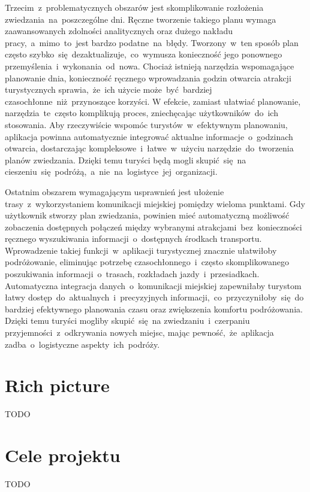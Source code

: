Trzecim~z~problematycznych obszarów jest skomplikowanie rozłożenia zwiedzania~na~poszczególne dni.
Ręczne tworzenie takiego planu wymaga zaawansowanych zdolności analitycznych oraz dużego nakładu pracy,~a~mimo~to~jest bardzo podatne~na~błędy.
Tworzony~w~ten sposób plan często szybko~się~dezaktualizuje,~co~wymusza konieczność jego ponownego przemyślenia~i~wykonania~od~nowa.
Chociaż istnieją narzędzia wspomagające planowanie dnia, konieczność ręcznego wprowadzania godzin otwarcia atrakcji turystycznych sprawia,~że~ich użycie może~być~bardziej czasochłonne~niż~przynoszące korzyści.
W efekcie, zamiast ułatwiać planowanie, narzędzia~te~często komplikują proces, zniechęcając użytkowników~do~ich stosowania.
Aby rzeczywiście wspomóc turystów~w~efektywnym planowaniu, aplikacja powinna automatycznie integrować aktualne informacje~o~godzinach otwarcia, dostarczając kompleksowe~i~łatwe~w~użyciu narzędzie~do~tworzenia planów zwiedzania.
Dzięki temu turyści będą mogli skupić~się~na cieszeniu~się~podróżą,~a~nie~na~logistyce~jej~organizacji.

Ostatnim obszarem wymagającym usprawnień jest ułożenie trasy~z~wykorzystaniem komunikacji miejskiej pomiędzy wieloma punktami.
Gdy użytkownik stworzy plan zwiedzania, powinien mieć automatyczną możliwość zobaczenia dostępnych połączeń między wybranymi atrakcjami~bez~konieczności ręcznego wyszukiwania informacji~o~dostępnych środkach transportu.
Wprowadzenie takiej funkcji~w~aplikacji turystycznej znacznie ułatwiłoby podróżowanie, eliminując potrzebę czasochłonnego~i~często skomplikowanego poszukiwania informacji~o~trasach, rozkładach jazdy~i~przesiadkach.
Automatyczna integracja danych~o~komunikacji miejskiej zapewniłaby turystom łatwy dostęp~do~aktualnych~i~precyzyjnych informacji,~co~przyczyniłoby~się~do bardziej efektywnego planowania czasu oraz zwiększenia komfortu podróżowania.
Dzięki temu turyści mogliby skupić~się~na zwiedzaniu~i~czerpaniu przyjemności~z~odkrywania nowych miejsc, mając pewność,~że~aplikacja zadba~o~logistyczne aspekty~ich~podróży.

\section{Rich picture}
\label{sec:rich-picture}

TODO

\section{Cele projektu}
\label{sec:cele-projektu}

TODO
